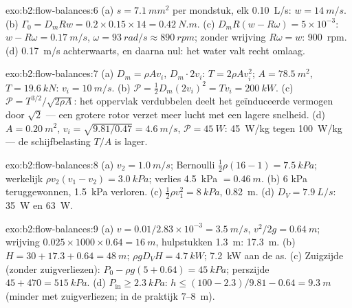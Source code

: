 \begin{solution}{exo:b2:flow-balances:6}
(a) $s = \qty{7.1}{mm^2}$ per mondstuk, elk \qty{0.10}{L/s}:
$w = \qty{14}{m/s}$. (b)
$\Gamma_0 = D_mRw = 0.2 \times 0.15 \times 14 = \qty{0.42}{N.m}$. (c)
$D_mR(w - R\omega) =
5 \times 10^{-3}$: $w - R\omega = \qty{0.17}{m/s}$,
$\omega = \qty{93}{rad/s} \approx \qty{890}{rpm}$; zonder wrijving
$R\omega = w$: \qty{900}{rpm}. (d) \qty{0.17}{m/s} achterwaarts, en daarna
nul: het water valt recht omlaag.
\end{solution}

\begin{solution}{exo:b2:flow-balances:7}
(a) $D_m = \rho Av_i$,  $D_m\cdot2v_i$: $T = 2\rho Av_i^2$;
$A = \qty{78.5}{m^2}$, $T = \qty{19.6}{kN}$: $v_i = \qty{10}{m/s}$. (b)
$\mathcal P = \tfrac12D_m(2v_i)^2 = Tv_i =
\qty{200}{kW}$. (c)
$\mathcal P = T^{3/2}/\sqrt{2\rho A}$: het oppervlak verdubbelen deelt het
geïnduceerde vermogen door $\sqrt2$ --- een grotere rotor verzet meer lucht
met een lagere snelheid. (d) $A = \qty{0.20}{m^2}$,
$v_i = \sqrt{9.81/0.47} = \qty{4.6}{m/s}$, $\mathcal P
= \qty{45}{W}$:
\qty{45}{W/kg} tegen \qty{100}{W/kg} --- de schijfbelasting $T/A$ is lager.
\end{solution}

\begin{solution}{exo:b2:flow-balances:8}
(a) $v_2 = \qty{1.0}{m/s}$; Bernoulli
$\tfrac12\rho(16 - 1) = \qty{7.5}{kPa}$; werkelijk
$\rho v_2(v_1 - v_2) = \qty{3.0}{kPa}$; verlies \qty{4.5}{kPa}
$= \qty{0.46}{m}$. (b) $6$ kPa teruggewonnen, \qty{1.5}{kPa} verloren. (c)
$\tfrac12\rho v_1^2 = \qty{8}{kPa}$, \qty{0.82}{m}. (d)
$D_V = \qty{7.9}{L/s}$: \qty{35}{W} en \qty{63}{W}.
\end{solution}

\begin{solution}{exo:b2:flow-balances:9}
(a) $v = 0.01/2.83 \times 10^{-3} = \qty{3.5}{m/s}$,
$v^2/2g = \qty{0.64}{m}$; wrijving
$0.025 \times 1000 \times 0.64 = \qty{16}{m}$, hulpstukken \qty{1.3}{m}:
\qty{17.3}{m}. (b) $H = 30 + 17.3 + 0.64 = \qty{48}{m}$;
$\rho gD_VH = \qty{4.7}{kW}$; \qty{7.2}{kW} aan de as. (c) Zuigzijde (zonder
zuigverliezen): $P_0 - \rho g(5 + 0.64) = \qty{45}{kPa}$; perszijde
$45 + 470 = \qty{515}{kPa}$. (d) $P_{\text{in}} \ge \qty{2.3}{kPa}$:
$h \le (100 -
2.3)/9.81 - 0.64 = \qty{9.3}{m}$ (minder met zuigverliezen; in
de praktijk $7$--\qty{8}{m}).
\end{solution}


